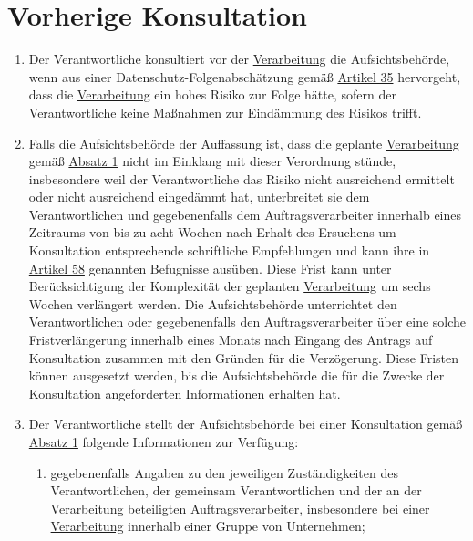 \chapter{Vorherige Konsultation}
\label{ch:36}


\begin{enumerate}

  \item Der Verantwortliche konsultiert vor der \hyperref[itm:04-2]{Verarbeitung} die Aufsichtsbehörde, wenn aus einer
   Datenschutz-Folgenabschätzung gemäß \hyperref[ch:35]{Artikel 35} hervorgeht, dass die \hyperref[itm:04-2]{Verarbeitung} ein hohes Risiko
   zur Folge hätte, sofern der Verantwortliche keine Maßnahmen zur Eindämmung des Risikos trifft.
  \label{itm:36-1}

  \item Falls die Aufsichtsbehörde der Auffassung ist, dass die geplante \hyperref[itm:04-2]{Verarbeitung} gemäß \hyperref[itm:36-1]
   {Absatz 1} nicht im Einklang mit dieser Verordnung stünde, insbesondere weil der Verantwortliche das Risiko nicht
   ausreichend ermittelt oder nicht ausreichend eingedämmt hat, unterbreitet sie dem Verantwortlichen und
   gegebenenfalls dem Auftragsverarbeiter innerhalb eines Zeitraums von bis zu acht Wochen nach Erhalt des Ersuchens um
   Konsultation entsprechende schriftliche Empfehlungen und kann ihre in \hyperref[ch:58]{Artikel 58} genannten
   Befugnisse ausüben. Diese Frist kann unter Berücksichtigung der Komplexität der geplanten \hyperref[itm:04-2]{Verarbeitung} um sechs
   Wochen verlängert werden. Die Aufsichtsbehörde unterrichtet den Verantwortlichen oder gegebenenfalls den
   Auftragsverarbeiter über eine solche Fristverlängerung innerhalb eines Monats nach Eingang des Antrags auf
   Konsultation zusammen mit den Gründen für die Verzögerung. Diese Fristen können ausgesetzt werden, bis die
   Aufsichtsbehörde die für die Zwecke der Konsultation angeforderten Informationen erhalten hat.
  \label{itm:36-2}

  \item Der Verantwortliche stellt der Aufsichtsbehörde bei einer Konsultation gemäß \hyperref[itm:36-1]{Absatz 1}
   folgende Informationen zur Verfügung:
  \label{itm:36-3}

  \begin{enumerate}
  
    \item gegebenenfalls Angaben zu den jeweiligen Zuständigkeiten des Verantwortlichen, der gemeinsam Verantwortlichen
     und der an der \hyperref[itm:04-2]{Verarbeitung} beteiligten Auftragsverarbeiter, insbesondere bei einer \hyperref[itm:04-2]{Verarbeitung} innerhalb einer
     Gruppe von Unternehmen;
    \label{itm:36-3a}


\end{enumerate}
\end{enumerate}
